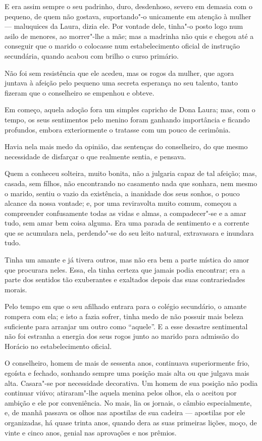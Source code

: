 E era assim sempre o seu padrinho, duro, desdenhoso, severo em demasia
com o pequeno, de quem não gostava, suportando"-o unicamente em atenção à
mulher --- maluquices da Laura, dizia ele. Por vontade dele, tinha"-o
posto logo num asilo de menores, ao morrer"-lhe a mãe; mas a madrinha não
quis e chegou até a conseguir que o marido o colocasse num
estabelecimento oficial de instrução secundária, quando acabou com
brilho o curso primário.

Não foi sem resistência que ele acedeu, mas os rogos da mulher, que
agora juntava à afeição pelo pequeno uma secreta esperança no seu
talento, tanto fizeram que o conselheiro se empenhou e obteve.

Em começo, aquela adoção fora um simples capricho de Dona Laura; mas,
com o tempo, os seus sentimentos pelo menino foram ganhando importância
e ficando profundos, embora exteriormente o tratasse com um pouco de
cerimônia.

Havia nela mais medo da opinião, das sentenças do conselheiro, do que
mesmo necessidade de disfarçar o que realmente sentia, e pensava.

Quem a conheceu solteira, muito bonita, não a julgaria capaz de tal
afeição; mas, casada, sem filhos, não encontrando no casamento nada que
sonhara, nem mesmo o marido, sentiu o vazio da existência, a inanidade
dos seus sonhos, o pouco alcance da nossa vontade; e, por uma
reviravolta muito comum, começou a compreender confusamente todas as
vidas e almas, a compadecer"-se e a amar tudo, sem amar bem coisa alguma.
Era uma parada de sentimento e a corrente que se acumulara nela,
perdendo"-se do seu leito natural, extravasara e inundara tudo.

Tinha um amante e já tivera outros, mas não era bem a parte mística do
amor que procurara neles. Essa, ela tinha certeza que jamais podia
encontrar; era a parte dos sentidos tão exuberantes e exaltados depois
das suas contrariedades morais.

Pelo tempo em que o seu afilhado entrara para o colégio secundário, o
amante rompera com ela; e isto a fazia sofrer, tinha medo de não possuir
mais beleza suficiente para arranjar um outro como ``aquele''. E a esse
desastre sentimental não foi estranha a energia dos seus rogos junto ao
marido para admissão do Horácio no estabelecimento oficial.

O conselheiro, homem de mais de sessenta anos, continuava superiormente
frio, egoísta e fechado, sonhando sempre uma posição mais alta ou que
julgava mais alta. Casara"-se por necessidade decorativa. Um homem de sua
posição não podia continuar viúvo; atiraram"-lhe aquela menina pelos
olhos, ela o aceitou por ambição e ele por conveniência. No mais, lia os
jornais, o câmbio especialmente, e, de manhã passava os olhos nas
apostilas de sua cadeira --- apostilas por ele organizadas, há quase
trinta anos, quando dera as suas primeiras lições, moço, de vinte e
cinco anos, genial nas aprovações e nos prêmios.

